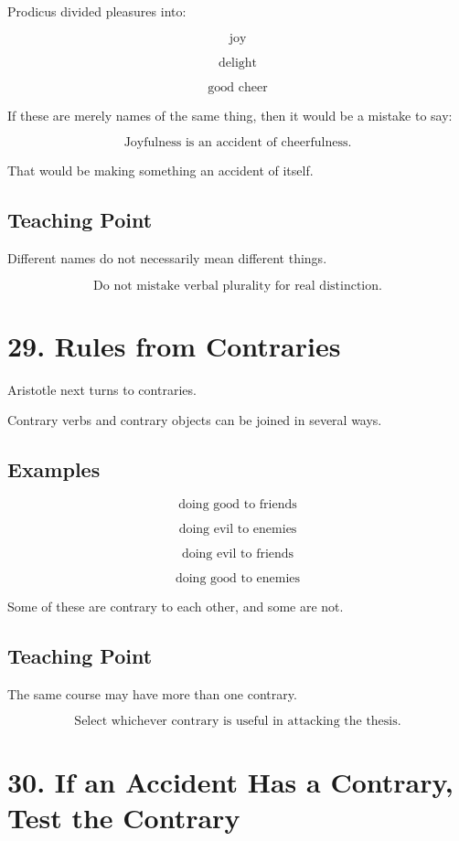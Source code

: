 \documentclass[12pt]{article}
\begin{document}
Prodicus divided pleasures into:

\[
\text{joy}
\]

\[
\text{delight}
\]

\[
\text{good cheer}
\]

If these are merely names of the same thing, then it would be a mistake to say:

\[
\text{Joyfulness is an accident of cheerfulness.}
\]

That would be making something an accident of itself.

\subsection*{Teaching Point}

Different names do not necessarily mean different things.

\[
\boxed{
\text{Do not mistake verbal plurality for real distinction.}
}
\]

\section*{29. Rules from Contraries}

Aristotle next turns to contraries.

Contrary verbs and contrary objects can be joined in several ways.

\subsection*{Examples}

\[
\text{doing good to friends}
\]

\[
\text{doing evil to enemies}
\]

\[
\text{doing evil to friends}
\]

\[
\text{doing good to enemies}
\]

Some of these are contrary to each other, and some are not.

\subsection*{Teaching Point}

The same course may have more than one contrary.

\[
\boxed{
\text{Select whichever contrary is useful in attacking the thesis.}
}
\]

\section*{30. If an Accident Has a Contrary, Test the Contrary}
\end{document}
